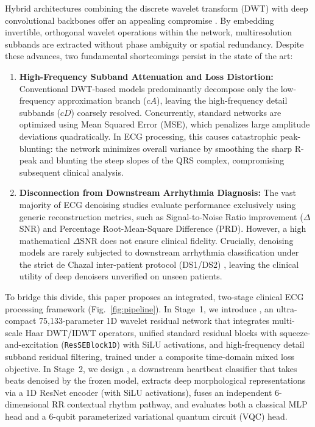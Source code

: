Hybrid architectures combining the discrete wavelet transform (DWT) with deep convolutional backbones offer an appealing compromise \cite{jin2024,nguyen2026liwave,nguyen2026dwse}. By embedding invertible, orthogonal wavelet operations within the network, multiresolution subbands are extracted without phase ambiguity or spatial redundancy. Despite these advances, two fundamental shortcomings persist in the state of the art:
\begin{enumerate}
    \item \textbf{High-Frequency Subband Attenuation and Loss Distortion:} Conventional DWT-based models predominantly decompose only the low-frequency approximation branch ($cA$), leaving the high-frequency detail subbands ($cD$) coarsely resolved. Concurrently, standard networks are optimized using Mean Squared Error (MSE), which penalizes large amplitude deviations quadratically. In ECG processing, this causes catastrophic peak-blunting: the network minimizes overall variance by smoothing the sharp R-peak and blunting the steep slopes of the QRS complex, compromising subsequent clinical analysis.
    \item \textbf{Disconnection from Downstream Arrhythmia Diagnosis:} The vast majority of ECG denoising studies evaluate performance exclusively using generic reconstruction metrics, such as Signal-to-Noise Ratio improvement ($\Delta$SNR) and Percentage Root-Mean-Square Difference (PRD). However, a high mathematical $\Delta$SNR does not ensure clinical fidelity. Crucially, denoising models are rarely subjected to downstream arrhythmia classification under the strict de Chazal inter-patient protocol (DS1/DS2) \cite{dechazal2004}, leaving the clinical utility of deep denoisers unverified on unseen patients.
\end{enumerate}

To bridge this divide, this paper proposes an integrated, two-stage clinical ECG processing framework (Fig.~\ref{fig:pipeline}). In Stage~1, we introduce \textbf{\HSL}, an ultra-compact 75{,}133-parameter 1D wavelet residual network that integrates multi-scale Haar DWT/IDWT operators, unified standard residual blocks with squeeze-and-excitation (\texttt{ResSEBlock1D}) with SiLU activations, and high-frequency detail subband residual filtering, trained under a composite time-domain mixed loss objective. In Stage~2, we design \textbf{\RRN}, a downstream heartbeat classifier that takes beats denoised by the frozen \HSL{} model, extracts deep morphological representations via a 1D ResNet encoder (with SiLU activations), fuses an independent 6-dimensional RR contextual rhythm pathway, and evaluates both a classical MLP head and a 6-qubit parameterized variational quantum circuit (VQC) head.

